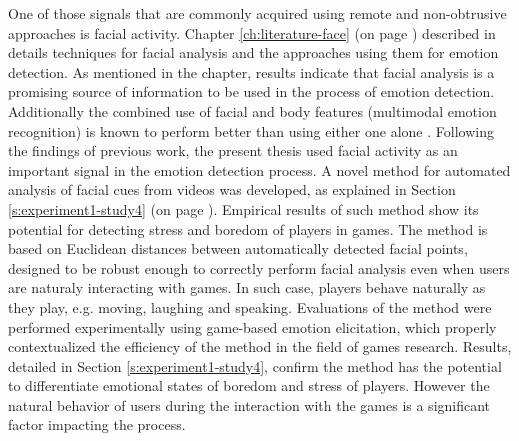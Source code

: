 One of those signals that are commonly acquired using remote and non-obtrusive approaches is facial activity. Chapter \ref{ch:literature-face} (on page \pageref{ch:literature-face}) described in details techniques for facial analysis and the approaches using them for emotion detection. As mentioned in the chapter, results indicate that facial analysis is a promising source of information to be used in the process of emotion detection. Additionally  the combined use of facial and body features (multimodal emotion recognition) is known to perform better than using either one alone \parencite{zacharatos2014automatic}. Following the findings of previous work, the present thesis used facial activity as an important signal in the emotion detection process. A novel method for automated analysis of facial cues from videos was developed, as explained in Section \ref{s:experiment1-study4} (on page \pageref{s:experiment1-study4}). Empirical results of such method show its potential for detecting stress and boredom of players in games. The method is based on Euclidean distances between automatically detected facial points, designed to be robust enough to correctly perform facial analysis even when users are naturaly interacting with games. In such case, players behave naturally as they play, e.g. moving, laughing and speaking. Evaluations of the method were performed experimentally using game-based emotion elicitation, which properly contextualized the efficiency of the method in the field of games research. Results, detailed in Section \ref{s:experiment1-study4}, confirm the method has the potential to differentiate emotional states of boredom and stress of players. However the natural behavior of users during the interaction with the games is a significant factor impacting the process.


